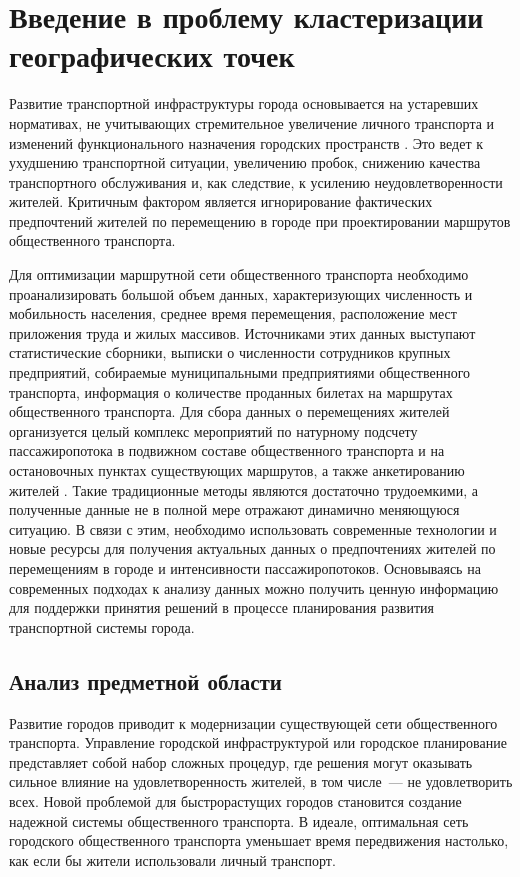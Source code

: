 \chapter{Введение в проблему кластеризации географических точек}

Развитие транспортной инфраструктуры города основывается на устаревших нормативах, не учитывающих стремительное увеличение личного транспорта и изменений функционального назначения городских пространств \cite{bib:1}. Это ведет к ухудшению транспортной ситуации, увеличению пробок, снижению качества транспортного обслуживания и, как следствие, к усилению неудовлетворенности жителей. Критичным фактором является игнорирование фактических предпочтений жителей по перемещению в городе при проектировании маршрутов общественного транспорта.

Для оптимизации маршрутной сети общественного транспорта необходимо проанализировать большой объем данных, характеризующих численность и мобильность населения, среднее время перемещения, расположение мест приложения труда и жилых массивов. Источниками этих данных выступают статистические сборники, выписки о численности сотрудников крупных предприятий, собираемые муниципальными предприятиями общественного транспорта, информация о количестве проданных билетах на маршрутах общественного транспорта. Для сбора данных о перемещениях жителей организуется целый комплекс мероприятий по натурному подсчету пассажиропотока в подвижном составе общественного транспорта и на остановочных пунктах существующих маршрутов, а также анкетированию жителей \cite{bib:2, bib:3}. Такие традиционные методы являются достаточно трудоемкими, а полученные данные не в полной мере отражают динамично меняющуюся ситуацию. В связи с этим, необходимо использовать современные технологии и новые ресурсы для получения актуальных данных о предпочтениях жителей по перемещениям в городе и интенсивности пассажиропотоков. Основываясь на современных подходах к анализу данных можно получить ценную информацию для поддержки принятия решений в процессе планирования развития транспортной системы города.


\section{Анализ предметной области}
Развитие городов приводит к модернизации существующей сети общественного транспорта. Управление городской инфраструктурой или городское планирование представляет собой набор сложных процедур, где решения могут оказывать сильное влияние на удовлетворенность жителей, в том числе~--- не удовлетворить всех. Новой проблемой для быстрорастущих городов становится создание надежной системы общественного транспорта. В идеале, оптимальная сеть городского общественного транспорта уменьшает время передвижения настолько, как если бы жители использовали личный транспорт.


